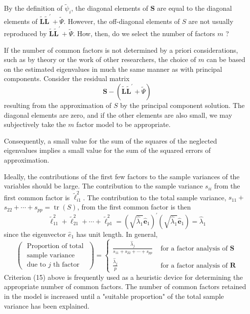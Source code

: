 \documentclass[12]{article}
\begin{document}
\noindent By the definition of $\widetilde{\psi}_i$, the diagonal elements of $\mathbf{S}$ are equal to the diagonal elements of $\widetilde{\mathbf{L}} \widetilde{\mathbf{L}}^{\prime}+\widetilde{\Psi}$. However, the off-diagonal elements of $S$ are not usually reproduced by $\widetilde{\mathbf{L}} \widetilde{\mathbf{L}}^{\prime}+\widetilde{\Psi}$. How, then, do we select the number of factors $m$ ?

\noindent If the number of common factors is not determined by a priori considerations, such as by theory or the work of other researchers, the choice of $m$ can be based on the estimated eigenvalues in much the same manner as with principal components. Consider the residual matrix
$$
\mathbf{S}-\left(\widetilde{\mathbf{L}} \tilde{\mathbf{L}}^{\prime}+\widetilde{\Psi}\right)
$$
resulting from the approximation of $S$ by the principal component solution. The diagonal elements are zero, and if the other elements are also small, we may subjectively take the $m$ factor model to be appropriate.

\noindent Consequently, a small value for the sum of the squares of the neglected eigenvalues implies a small value for the sum of the squared errors of approximation.

\noindent Ideally, the contributions of the first few factors to the sample variances of the variables should be large. The contribution to the sample variance $s_{i i}$ from the first common factor is $\widetilde{\ell}_{i 1}^2$. The contribution to the total sample variance, $s_{11}+$ $s_{22}+\cdots+s_{p p}=\operatorname{tr}(S)$, from the first common factor is then
$$
\tilde{\ell}_{11}^2+\tilde{\ell}_{21}^2+\cdots+\tilde{\ell}_{p 1}^2=\left(\sqrt{\hat{\lambda}_1} \hat{\mathbf{e}}_1\right)^{\prime}\left(\sqrt{\hat{\lambda}_1} \hat{\mathbf{e}}_1\right)=\hat{\lambda}_1
$$
since the eigenvector $\hat{e}_1$ has unit length. In general,
\begin{equation}
	\left(\begin{array}{c}
		\text { Proportion of total } \\
		\text { sample variance } \\
		\text { due to } j \text { th factor }
	\end{array}\right)=\left\{\begin{array}{cl}
		\frac{\hat{\lambda}_j}{s_{11}+s_{22}+\cdots+s_{p p}} & \text { for a factor analysis of } \mathbf{S} \\
		\frac{\hat{\lambda}_j}{p} & \text { for a factor analysis of } \mathbf{R}
	\end{array}\right.
\end{equation}
Criterion (15) above is frequently used as a heuristic device for determining the appropriate number of common factors. The number of common factors retained in the model is increased until a "suitable proportion" of the total sample variance has been explained.
\end{document}
